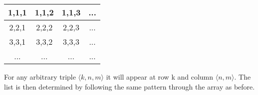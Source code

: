 \documentclass[../../../include/open-logic-section]{subfiles}
\begin{document}
\begin{tabular}{c|c|c|c} 
1,1,1 & 1,1,2 & 1,1,3 & ... \\\hline
2,2,1 & 2,2,2 & 2,2,3 & ... \\\hline
3,3,1 & 3,3,2 & 3,3,3 & ... \\\hline
... & ... & ... & ... \\
\end{tabular}

For any arbitrary triple $\langle k,n,m\rangle$ it will appear at row k and
column $\langle n,m\rangle$. The list is then determined by following the
same pattern through the array as before.
\end{document}
